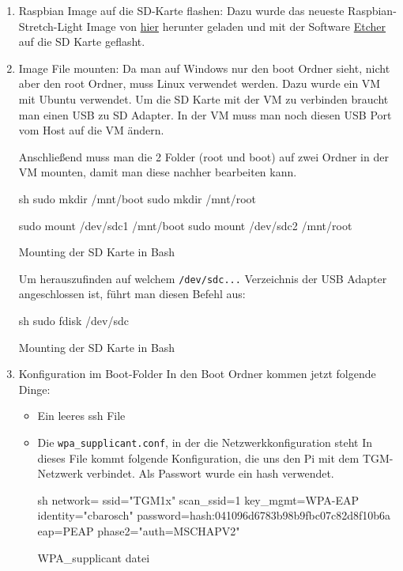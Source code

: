 \begin{enumerate}
    \item Raspbian Image auf die SD-Karte flashen: Dazu wurde das neueste Raspbian-Stretch-Light Image von \hyperlink{https://www.raspberrypi.org/downloads/raspbian/}{hier} herunter geladen und mit der Software \hyperlink{https://www.balena.io/etcher/}{Etcher} auf die SD Karte geflasht.
    \item Image File mounten: Da man auf Windows nur den boot Ordner sieht, nicht aber den root Ordner, muss Linux verwendet werden. Dazu wurde ein VM mit Ubuntu verwendet.
    Um die SD Karte mit der VM zu verbinden braucht man einen USB zu SD Adapter. In der VM muss man noch diesen USB Port vom Host auf die VM ändern.

    Anschließend muss man die 2 Folder (root und boot) auf zwei Ordner in der VM mounten, damit man diese nachher bearbeiten kann.

    \begin{listing}
        \begin{code}[firstnumber=last]{sh}
            sudo mkdir /mnt/boot
            sudo mkdir /mnt/root

            sudo mount /dev/sdc1 /mnt/boot
            sudo mount /dev/sdc2 /mnt/root
        \end{code}
        \caption{Mounting der SD Karte in Bash}
    \end{listing}
    Um herauszufinden auf welchem \texttt{/dev/sdc...} Verzeichnis der USB Adapter angeschlossen ist, führt man diesen Befehl aus:

    \begin{listing}
        \begin{code}[firstnumber=last]{sh}
            sudo fdisk /dev/sdc
        \end{code}
        \caption{Mounting der SD Karte in Bash}
    \end{listing}

    \item Konfiguration im Boot-Folder
    In den Boot Ordner kommen jetzt folgende Dinge:
    \begin{itemize}
        \item Ein leeres ssh File
        \item Die \texttt{wpa\_supplicant.conf}, in der die Netzwerkkonfiguration steht
        In dieses File kommt folgende Konfiguration, die uns den Pi mit dem TGM-Netzwerk verbindet. Als Passwort wurde ein hash verwendet.

        \begin{listing}
            \begin{code}[firstnumber=last]{sh}
                network={
                    ssid="TGM1x"
                    scan_ssid=1
                    key_mgmt=WPA-EAP
                    identity="cbarosch"
                    password=hash:041096d6783b98b9fbc07c82d8f10b6a
                    eap=PEAP
                    phase2="auth=MSCHAPV2"
                }
            \end{code}
            \caption{WPA\_supplicant datei}
        \end{listing}
    \end{itemize}


\end{enumerate}
